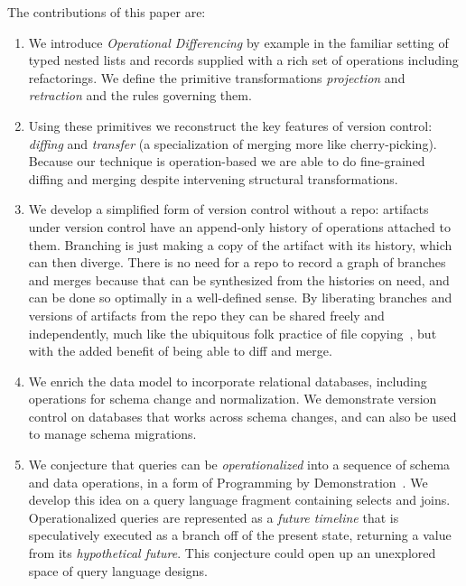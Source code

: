 \documentclass[english,submission]{programming}
\theoremstyle{definition}
\begin{document}
The contributions of this paper are:

\begin{enumerate}

\item We introduce \textit{Operational Differencing} by example in the familiar setting of typed nested lists and records supplied with a rich set of operations
including refactorings. We define the primitive transformations \textit{projection} and \textit{retraction} and the rules governing them.

\item Using these primitives we reconstruct the key features of version control: \textit{diffing} and \textit{transfer} (a specialization of merging more like cherry-picking). Because our technique is operation-based we are able to do fine-grained diffing and merging despite intervening structural transformations.

\item We develop a simplified form of version control without a repo: artifacts under version control have an append-only history of operations attached to them. Branching is just making a copy of the artifact with its history, which can then diverge. There is no need for a repo to record a graph of branches and merges because that can be synthesized from the histories on need, and can be done so optimally in a well-defined sense. By liberating branches and versions of artifacts from the repo they can be shared freely and independently, much like the ubiquitous folk practice of file copying~\cite{Burnett14, Basman19}, but with the added benefit of being able to diff and merge.

\item We enrich the data model to incorporate relational databases, including operations for schema change and normalization. We demonstrate version control on databases that works across schema changes, and can also be used to manage schema migrations.

\item We conjecture that queries can be \textit{operationalized} into a sequence of schema and data operations, in a form of Programming by Demonstration~\cite{cypher93-pbd}. We develop this idea on a query language fragment containing selects and joins. Operationalized queries are represented as a \textit{future timeline} that is speculatively executed as a branch off of the present state, returning a value from its \textit{hypothetical future}. This conjecture could open up an unexplored space of query language designs.


\end{enumerate}
\end{document}
